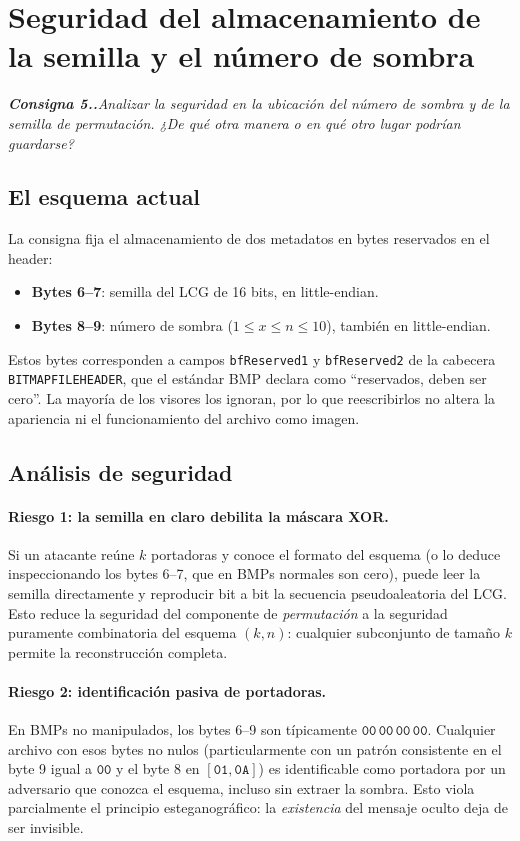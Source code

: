 \documentclass[11pt,a4paper]{article}
\newcommand{\pregunta}[1]{%
    \begingroup
    \itshape\small\color{gray!30!black}\textbf{Consigna 5.\arabic{section}.}\enspace #1\par\medskip
    \endgroup
}
\begin{document}
\section{Seguridad del almacenamiento de la semilla y el número de sombra}\label{sec:seguridad}
\pregunta{Analizar la seguridad en la ubicación del número de sombra y de
la semilla de permutación. ¿De qué otra manera o en qué otro lugar podrían
guardarse?}

\subsection*{El esquema actual}

La consigna fija el almacenamiento de dos metadatos en bytes reservados en
el header:
\begin{itemize}[leftmargin=*,nosep]
    \item \textbf{Bytes 6--7}: semilla del LCG de 16 bits, en
          little-endian.
    \item \textbf{Bytes 8--9}: número de sombra ($1 \leq x \leq n \leq 10$),
          también en little-endian.
\end{itemize}
Estos bytes corresponden a campos \texttt{bfReserved1} y
\texttt{bfReserved2} de la cabecera \texttt{BITMAPFILEHEADER}, que el
estándar BMP declara como ``reservados, deben ser cero''. La mayoría de los
visores los ignoran, por lo que reescribirlos no altera la apariencia ni el
funcionamiento del archivo como imagen.

\subsection*{Análisis de seguridad}

\paragraph{Riesgo 1: la semilla en claro debilita la máscara XOR.}
Si un atacante reúne $k$ portadoras y conoce el formato del esquema (o lo
deduce inspeccionando los bytes 6--7, que en BMPs normales son cero), puede
leer la semilla directamente y reproducir bit a bit la secuencia
pseudoaleatoria del LCG. Esto reduce la seguridad del componente de
\emph{permutación} a la seguridad puramente combinatoria del esquema
$(k,n)$: cualquier subconjunto de tamaño $k$ permite la reconstrucción
completa.

\paragraph{Riesgo 2: identificación pasiva de portadoras.}
En BMPs no manipulados, los bytes 6--9 son típicamente $\mathtt{00\,00\,00\,00}$.
Cualquier archivo con esos bytes no nulos (particularmente con un
patrón consistente en el byte 9 igual a $\mathtt{00}$ y el byte 8 en
$[\mathtt{01},\mathtt{0A}]$) es identificable como portadora por un
adversario que conozca el esquema, incluso sin extraer la sombra. Esto viola
parcialmente el principio esteganográfico: la \emph{existencia} del mensaje
oculto deja de ser invisible.
\end{document}
